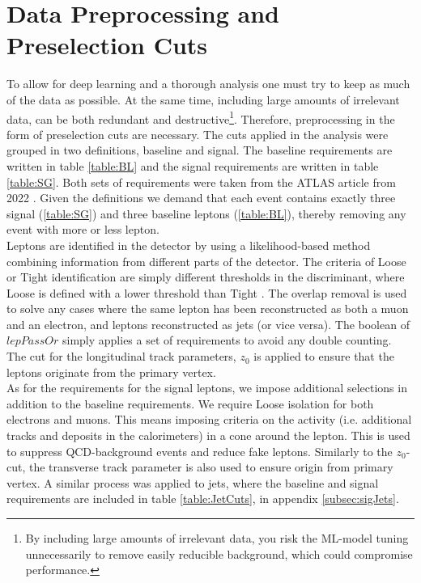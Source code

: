 \section{Data Preprocessing and Preselection Cuts}\label{subsec:Cuts}
To allow for deep learning and a thorough analysis one must try to keep
as much of the data as possible. At the same time, including large amounts
of irrelevant data, can be both redundant and destructive\footnote{By including 
large amounts of irrelevant data, you risk the \ac{ML}-model tuning unnecessarily 
to remove easily reducible background, which could compromise performance.}. 
Therefore, preprocessing in the form of preselection cuts are necessary. 
The cuts applied in the analysis were grouped in two definitions, baseline and signal. 
The baseline requirements are written in table \ref{table:BL} and the signal requirements are written 
in table \ref{table:SG}. Both sets of requirements were taken from the \ac{ATLAS} article from 2022 \cite{franchini_search_2019}.
Given the definitions we demand that each event contains exactly three signal (\ref{table:SG}) and 
three baseline leptons (\ref{table:BL}), thereby removing any event with more or less lepton. 
\\
Leptons are identified in the detector by using a likelihood-based method combining
information from different parts of the detector. The criteria of Loose or Tight 
identification are simply different thresholds in the discriminant, where Loose is 
defined with a lower threshold than Tight \cite{Aaboud_2019}. The overlap removal is used to solve any cases
where the same lepton has been reconstructed as both a muon and an electron, and leptons reconstructed 
as jets (or vice versa). The boolean of $lepPassOr$ simply applies a set of requirements to avoid any double 
counting. The cut for the longitudinal track parameters, $z_0$ is applied to ensure that the leptons originate 
from the primary vertex.
\\
As for the requirements for the signal leptons, we impose additional selections in addition 
to the baseline requirements. We require Loose isolation for both electrons and muons. This means
imposing criteria on the activity (i.e. additional tracks and deposits in the calorimeters) in a cone around the lepton. 
This is used to suppress \ac{QCD}-background events and reduce fake leptons. Similarly to the $z_0$-cut, the transverse 
track parameter is also used to ensure origin from primary vertex. A similar process was applied to jets, where the baseline 
and signal requirements are included in table \ref{table:JetCuts}, in appendix \ref{subsec:sigJets}.
